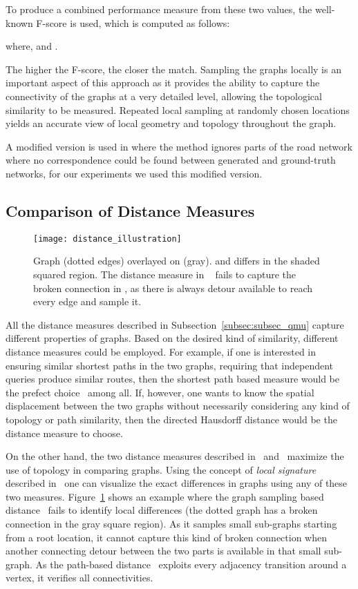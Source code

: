 \documentclass[natbib]{svjour3}                    \smartqed  \usepackage[table]{xcolor}
\begin{document}
To produce a combined performance measure from these two values, the well-known F-score is used, which is computed as follows:

where,  and .

The higher the F-score, the closer the match. Sampling the graphs locally is an important aspect of this approach as it provides the ability to capture the connectivity of the graphs at a very detailed level, 
allowing the topological similarity to be measured. Repeated local sampling at randomly chosen locations yields an accurate view of local geometry and topology throughout the graph.

A modified version is used in \cite{Biagioni:2012:MIF:2424321.2424333} where the method ignores parts of the road network where no correspondence could be found between generated and ground-truth networks, for our experiments we used this modified version.

\subsection{Comparison of Distance Measures}
\begin{figure}
\centering
\texttt{[image: distance\_illustration]}
\caption{Graph  (dotted edges) overlayed on  (gray).  and  differs in the shaded squared region. The distance measure in ~\cite{Biagioni:2012:MIF:2424321.2424333} fails to capture the broken connection in , as there is always detour available to reach every edge and sample it.}
\label{fig:distance_illustration}
\end{figure}
All the distance measures described in Subsection~\ref{subsec:subsec_qmu} capture different properties of graphs.
Based on the desired kind of similarity, different distance measures could be employed.
For example, if one is interested in ensuring similar shortest paths in the two graphs, requiring that independent queries produce similar routes, then the  shortest path based measure would be the prefect choice~\cite{MondzechS11, Karagiorgou:2012:VTD:2424321.2424334} among 
all. If, however, one wants to know the spatial displacement between the two graphs without necessarily considering any kind of topology or path similarity, then the directed Hausdorff distance \cite{ag-dgsmi-99} would be the distance measure to choose.

On the other hand, the two distance measures described in~\cite{Biagioni:2012:MIF:2424321.2424333} and~\cite{aw-SIGSPATIAL-13} maximize the use of topology in comparing graphs. Using the concept of {\em local signature} described in~\cite{aw-SIGSPATIAL-13} one can visualize the exact differences in graphs using any of these two measures. Figure~\ref{fig:distance_illustration} shows an example where the graph sampling based distance~\cite{Biagioni:2012:MIF:2424321.2424333} fails to identify local differences (the dotted graph has a broken connection in the gray square region). As it samples small sub-graphs starting from a root location, it cannot capture this kind of broken connection when another connecting detour between the two parts is available in that small sub-graph. As 
the path-based distance~\cite{aw-SIGSPATIAL-13} exploits every adjacency transition around a vertex, it verifies all connectivities. 
\end{document}
